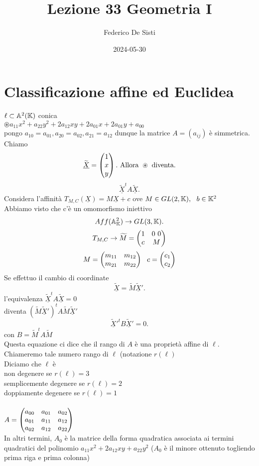\documentclass[12px]{article}
\title{Lezione 33 Geometria I}
\date{2024-05-30}
\author{Federico De Sisti}
\begin{document}
	\maketitle
	\newpage
	\section{Classificazione affine ed Euclidea}
	$\ell \subset \mathbb{A}^2(\mathbb{K}) $ conica\\
	$\circledast a_{11}x^2 + a_{22}y^2 + 2a_{12}xy + 2a_{01}x + 2a_{01}y + a_{00}$\\
	pongo $a_{10}=a_{01}, a_{20}=a_{02},a_{21}=a_{12}$ dunque la matrice $A=(a_{ij})$ è simmetrica. Chiamo
	\[
		\widetilde{\underline X} = \begin{pmatrix}1\\x\\y\end{pmatrix}. \text{ Allora } \circledast \text{ diventa}
	.\] 
	\[
	\underline{\widetilde{X}}^t A\underline{\widetilde{X}}
	.\] 
	Considera l'affinità $T_{M,C}(\underline X ) = M\underline X + c$ ove  $M\in GL(2,\mathbb{K}), \ \ b\in \mathbb{K}^2$\\
	Abbiamo visto che c'è un omomorfismo iniettivo 
	\[
	Aff(\mathbb{A}^2_{\mathbb{K}}) \rightarrow GL(3,\mathbb{K})
	.\] 
	\[
		T_{M,C} \rightarrow \widetilde M = \begin{pmatrix} 1 & 0\ 0\\ c & M \end{pmatrix}
	\] 
	\[
		M = \begin{pmatrix}m_{11}&m_{12}\\m_{21}&m_{22}\end{pmatrix} \ \ c = \begin{pmatrix}c_1\\c_2\end{pmatrix}
	\] 
	Se effettuo il cambio di coordinate
	\[
		\widetilde{\underline{X}} = \widetilde{M}\widetilde{\underline{X}}'
	.\] 
	l'equivalenza $\widetilde{\underline{X}}^t A \widetilde{\underline{X}} = 0$ \\
	diventa  $(\widetilde M\widetilde{\underline{X}}')^t A \widetilde{M}\widetilde{\underline {X}}'$ \\
	\[
	\widetilde{\underline{X}}'^t B \widetilde{\underline{X}}'= 0
	.\] 
	con $B = \widetilde{M}^t A\widetilde{M}$\\
	Questa equazione ci dice che il rango di  $A$ è una proprietà affine di $\ell$. Chiameremo tale numero rango di $\ell$ (notazione $r(\ell)$\\
	Diciamo che  $\ell$ è\\
	non degenere se $r(\ell) = 3$\\
	semplicemente degenere se  $r(\ell) = 2$\\
	doppiamente degenere se  $r(\ell) = 1$
	\ \\ \hline \ \\
	$A = \begin{pmatrix}a_{00}&a_{01} & a_{02}\\a_{01} & a_{11} & a_{12} \\ a_{02} & a_{12} & a_{22}\end{pmatrix}$ \\In altri termini, $A_0$ è la matrice della forma quadratica associata ai termini quadratici del polinomio $a_{11}x^2 + 2a_{12}xy + a_{22}y^ 2$ ($A_0$ è il minore ottenuto togliendo prima riga e prima colonna)\\
\end{document}
